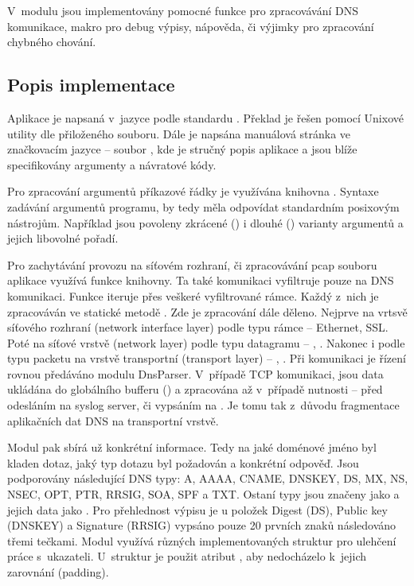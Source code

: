 \documentclass[11pt, a4paper, titlepage]{article}
\begin{document}
V~modulu  jsou implementovány pomocné funkce pro zpracovávání DNS komunikace, makro pro debug výpisy, nápověda, či výjimky pro zpracování chybného chování.
\bigskip



\subsection{Popis implementace}

Aplikace je napsaná v~jazyce  podle standardu . Překlad je řešen pomocí Unixové utility  dle přiloženého  souboru. Dále je napsána manuálová stránka ve značkovacím jazyce  -- soubor , kde je stručný popis aplikace a jsou blíže specifikovány argumenty a návratové kódy.
\bigskip

Pro zpracování argumentů příkazové řádky je využívána knihovna . Syntaxe zadávání argumentů programu, by tedy měla odpovídat standardním posixovým nástrojům. Například jsou povoleny zkrácené () i dlouhé () varianty argumentů a jejich libovolné pořadí.
\bigskip

Pro zachytávání provozu na síťovém rozhraní, či zpracovávání pcap souboru aplikace využívá funkce  knihovny. Ta také komunikaci vyfiltruje pouze na DNS komunikaci. Funkce  iteruje přes veškeré vyfiltrované rámce. Každý z~nich je zpracováván ve statické metodě . Zde je zpracování dále děleno. Nejprve na vrtsvě síťového rozhraní (network interface layer) podle typu rámce -- Ethernet, SSL. Poté na síťové vrstvě (network layer) podle typu datagramu -- , . Nakonec i podle typu packetu na vrstvě transportní (transport layer) -- , . Při  komunikaci je řízení rovnou předáváno modulu DnsParser. V~případě TCP komunikaci, jsou data ukládána do globálního bufferu () a zpracována až v~případě nutnosti -- před odesláním na syslog server, či vypsáním na . Je tomu tak z~důvodu fragmentace aplikačních dat DNS na transportní vrstvě.
\bigskip

Modul  pak sbírá už konkrétní informace. Tedy na jaké doménové jméno byl kladen dotaz, jaký typ dotazu byl požadován a konkrétní odpověď. Jsou podporovány následující DNS typy: A, AAAA, CNAME, DNSKEY, DS, MX, NS, NSEC, OPT, PTR, RRSIG, SOA, SPF a TXT. Ostaní typy jsou značeny jako  a jejich data jako . Pro přehlednost výpisu je u položek Digest (DS), Public key (DNSKEY) a Signature (RRSIG) vypsáno pouze 20 prvních znaků následováno třemi tečkami. Modul využívá různých implementovaných struktur pro ulehčení práce s~ukazateli. U~struktur je použit atribut , aby nedocházelo k~jejich zarovnání (padding).
\bigskip
\end{document}
